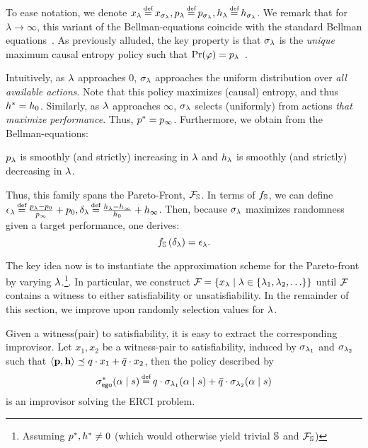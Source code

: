 To ease notation, we denote $x_\rat \eqdef x_{\sched_\rat},
\scp_\rat \eqdef \scp_{\sched_\rat}, \rndp_\rat \eqdef
\rndp_{\sched_\rat}$. 
We remark that for $\lambda \rightarrow \infty$, this variant of the Bellman-equations coincide with the standard Bellman equations~\cite{DBLP:books/wi/Puterman94}.
As previously alluded, the key property
is that $\sigma_\lambda$ is the \emph{unique} maximum causal entropy policy
such that $\Pr(\varphi) = p_\lambda$~\cite{mceThesis}.

Intuitively, as $\lambda$ approaches $0$, $\sigma_\lambda$ approaches the
uniform distribution over \emph{all available actions}. Note that this
policy maximizes (causal) entropy, and thus $h^{*} = h_0$.
Similarly, as $\lambda$ approaches $\infty$, $\sigma_\lambda$ selects (uniformly) from
actions \emph{that maximize performance}. Thus, $p^{*} = p_\infty$.
Furthermore, we obtain from the Bellman-equations:
\begin{proposition}
  $p_\lambda$ is  smoothly (and strictly) increasing in $\lambda$ and $h_\lambda$
  is smoothly (and strictly) decreasing in $\lambda$.
\end{proposition}
Thus, this
family spans the Pareto-Front, $\mathcal{F}_{\mathbb{S}}$.
In terms of $f_\mathbb{S}$, we 
can define $\epsilon_\rat \eqdef \frac{\scp_\rat - \scp_0}{\scp_\infty} + \scp_0, \delta_\rat \eqdef \frac{\rndp_\rat - \rndp_\infty}{\rndp_0} + \rndp_{\infty}$. Then, because
$\sigma_\lambda$ maximizes randomness given a target performance, one derives:
\begin{equation}
  f_\mathbb{S}\left(\delta_\lambda\right) = \epsilon_\lambda.
\end{equation}

The key idea now is to instantiate the approximation scheme for the Pareto-front by varying $\lambda$.\footnote{Assuming $p^{*}, h^{*} \neq 0$ (which would
otherwise yield trivial $\mathbb{S}$ and $\mathcal{F}_{\mathbb{S}}$)}.
In particular, we construct $\mathcal{F}_{} = \{ x_\lambda \mid \lambda \in \{ \lambda_1, \lambda_2, \hdots \} \}$ until $\mathcal{F}_{}$ contains a witness to either satisfiability or unsatisfiability. 
In the remainder of this section, we improve upon randomly selection values for $\lambda$.

\begin{remark}
Given a witness(pair) to satisfiability, it is easy to extract the corresponding improvisor. Let $x_1,x_2$ be a witness-pair to satisfiability,  induced by $\sigma_{\lambda_1}$ and $\sigma_{\lambda_2}$ such that $\langle\mathbf{p}, \mathbf{h}\rangle\preceq q\cdot x_1 + \bar{q}\cdot x_2$, then the policy described by  	
\begin{equation}\label{eq:4}
  \sigma^*_\pOne(\act \mid s) \eqdef q\cdot \sched_{\rat_1}(\act \mid s) + \bar{q} \cdot \sched_{\rat_2}(\act  \mid s)
\end{equation}
is an improvisor solving the ERCI problem.
\end{remark}



